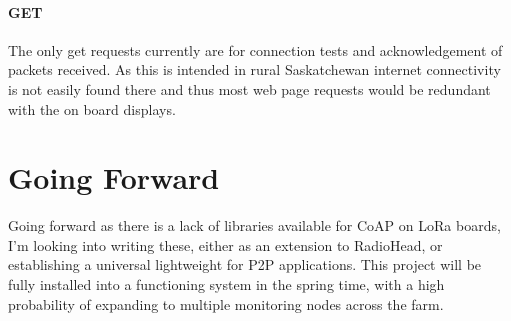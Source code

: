 \documentclass[]{report}
\begin{document}
\paragraph{GET}
The only get requests currently are for connection tests and acknowledgement of packets received. As this is intended in rural Saskatchewan internet connectivity is not easily found there and thus most web page requests would be redundant with the on board displays.

\section{Going Forward}
Going forward as there is a lack of libraries available for CoAP on LoRa boards, I'm looking into writing these, either as an extension to RadioHead, or establishing a universal lightweight for P2P applications. This project will be fully installed into a functioning system in the spring time, with a high probability of expanding to multiple monitoring nodes across the farm.
\end{document}
